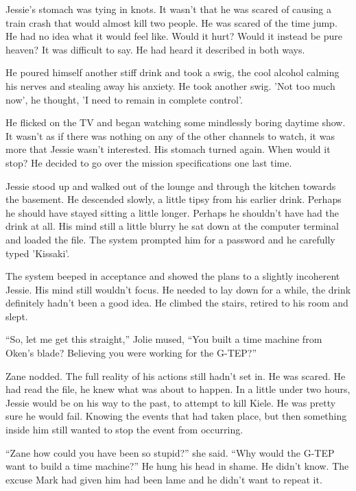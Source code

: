 Jessie's stomach was tying in knots.  It wasn't that he was scared of causing a train crash that would almost kill two people.  He was scared of the time jump.  He had no idea what it would feel like.  Would it hurt?  Would it instead be pure heaven?  It was difficult to say.  He had heard it described in both ways.  

He poured himself another stiff drink and took a swig, the cool alcohol calming his nerves and stealing away his anxiety.  He took another swig.  'Not too much now', he thought, 'I need to remain in complete control'.  

He flicked on the TV and began watching some mindlessly boring daytime show.  It wasn't as if there was nothing on any of the other channels to watch, it was more that Jessie wasn't interested.  His stomach turned again.  When would it stop?  He decided to go over the mission specifications one last time.  

Jessie stood up and walked out of the lounge and through the kitchen towards the basement.  He descended slowly, a little tipsy from his earlier drink.  Perhaps he should have stayed sitting a little longer.  Perhaps he shouldn't have had the drink at all.  His mind still a little blurry he sat down at the computer terminal and loaded the file.  The system prompted him for a password and he carefully typed 'Kissaki'.

The system beeped in acceptance and showed the plans to a slightly incoherent Jessie.  His mind still wouldn't focus.  He needed to lay down for a while, the drink definitely hadn't been a good idea.  He climbed the stairs, retired to his room and slept.



\thoughtbreak



``So, let me get this straight,'' Jolie mused, ``You built a time machine from Oken's blade?  Believing  you were working for the G-TEP?''

Zane nodded.  The full reality of his actions still hadn't set in.  He was scared.  He had read the file, he knew what was about to happen.  In a little under two hours, Jessie would be on his way to the past, to attempt to kill Kiele.  He was pretty sure he would fail.  Knowing the events that had taken place, but then something inside him still wanted to stop the event from occurring.

``Zane how could you have been so stupid?'' she said.  ``Why would the G-TEP want to build a time machine?''  He hung his head in shame.  He didn't know.  The excuse Mark had given him had been lame and he didn't want to repeat it.

